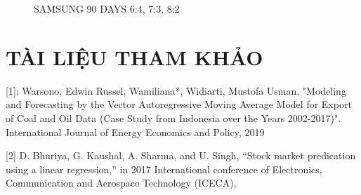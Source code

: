 \documentclass{article}
\begin{document}
\begin{multicols}{2}
\begin{figure}[H]
\begin{minipage}{0.15\textwidth}
    \label{fig:3}
    \end{minipage}
    \caption{SAMSUNG 90 DAYS  6:4, 7:3, 8:2 }
\end{figure}

\section{TÀI LIỆU THAM KHẢO}

 
[1]: Warsono, Edwin Russel, Wamiliana*, Widiarti, Mustofa Usman, "Modeling and Forecasting by the Vector Autoregressive Moving Average Model for Export of Coal and Oil Data (Case Study from Indonesia over the Years 2002-2017)". International Journal of Energy Economics and Policy, 2019


[2] D. Bhuriya, G. Kaushal, A. Sharma, and U. Singh, “Stock market predication using a linear regression,” in 2017 International conference of Electronics, Communication and Aerospace Technology (ICECA),


\end{multicols}
\end{document}

